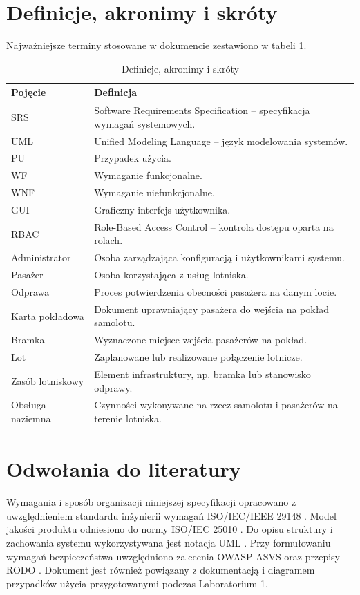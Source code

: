 \documentclass[12pt,a4paper,oneside]{report}
\begin{document}
\section{Definicje, akronimy i skróty}
Najważniejsze terminy stosowane w dokumencie zestawiono w tabeli \ref{tab:slownik}.
\begin{longtable}{|p{3.2cm}|p{10.5cm}|}
\caption{Definicje, akronimy i skróty}\label{tab:slownik}\\\hline
\rowcolor{lightblue}\textbf{Pojęcie} & \textbf{Definicja}\\\hline
SRS & Software Requirements Specification -- specyfikacja wymagań systemowych.\\\hline
UML & Unified Modeling Language -- język modelowania systemów.\\\hline
PU & Przypadek użycia.\\\hline
WF & Wymaganie funkcjonalne.\\\hline
WNF & Wymaganie niefunkcjonalne.\\\hline
GUI & Graficzny interfejs użytkownika.\\\hline
RBAC & Role-Based Access Control -- kontrola dostępu oparta na rolach.\\\hline
Administrator & Osoba zarządzająca konfiguracją i użytkownikami systemu.\\\hline
Pasażer & Osoba korzystająca z usług lotniska.\\\hline
Odprawa & Proces potwierdzenia obecności pasażera na danym locie.\\\hline
Karta pokładowa & Dokument uprawniający pasażera do wejścia na pokład samolotu.\\\hline
Bramka & Wyznaczone miejsce wejścia pasażerów na pokład.\\\hline
Lot & Zaplanowane lub realizowane połączenie lotnicze.\\\hline
Zasób lotniskowy & Element infrastruktury, np. bramka lub stanowisko odprawy.\\\hline
Obsługa naziemna & Czynności wykonywane na rzecz samolotu i pasażerów na terenie lotniska.\\\hline
\end{longtable}

\section{Odwołania do literatury}
Wymagania i sposób organizacji niniejszej specyfikacji opracowano z uwzględnieniem standardu inżynierii wymagań ISO/IEC/IEEE 29148 \cite{iso29148}. Model jakości produktu odniesiono do normy ISO/IEC 25010 \cite{iso25010}. Do opisu struktury i zachowania systemu wykorzystywana jest notacja UML \cite{uml}. Przy formułowaniu wymagań bezpieczeństwa uwzględniono zalecenia OWASP ASVS \cite{owasp} oraz przepisy RODO \cite{rodo}. Dokument jest również powiązany z dokumentacją i diagramem przypadków użycia przygotowanymi podczas Laboratorium 1.
\end{document}

